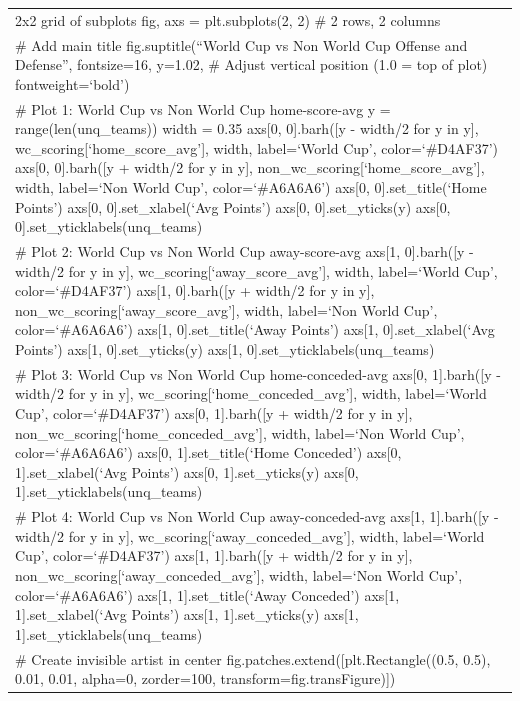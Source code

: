 \documentclass[
  letterpaper,
  DIV=11,
  numbers=noendperiod]{scrartcl}
\begin{document}
\begin{longtable}[]{@{}
  >{\raggedright\arraybackslash}p{}@{}}
2x2 grid of subplots fig, axs = plt.subplots(2, 2) \# 2 rows, 2
columns \\
\# Add main title fig.suptitle(``World Cup vs Non World Cup Offense and
Defense'', fontsize=16, y=1.02, \# Adjust vertical position (1.0 = top
of plot) fontweight=`bold') \\
\# Plot 1: World Cup vs Non World Cup home-score-avg y =
range(len(unq\_teams)) width = 0.35 axs{[}0, 0{]}.barh({[}y - width/2
for y in y{]}, wc\_scoring{[}`home\_score\_avg'{]}, width, label=`World
Cup', color=`\#D4AF37') axs{[}0, 0{]}.barh({[}y + width/2 for y in y{]},
non\_wc\_scoring{[}`home\_score\_avg'{]}, width, label=`Non World Cup',
color=`\#A6A6A6') axs{[}0, 0{]}.set\_title(`Home Points') axs{[}0,
0{]}.set\_xlabel(`Avg Points') axs{[}0, 0{]}.set\_yticks(y) axs{[}0,
0{]}.set\_yticklabels(unq\_teams) \\
\# Plot 2: World Cup vs Non World Cup away-score-avg axs{[}1,
0{]}.barh({[}y - width/2 for y in y{]},
wc\_scoring{[}`away\_score\_avg'{]}, width, label=`World Cup',
color=`\#D4AF37') axs{[}1, 0{]}.barh({[}y + width/2 for y in y{]},
non\_wc\_scoring{[}`away\_score\_avg'{]}, width, label=`Non World Cup',
color=`\#A6A6A6') axs{[}1, 0{]}.set\_title(`Away Points') axs{[}1,
0{]}.set\_xlabel(`Avg Points') axs{[}1, 0{]}.set\_yticks(y) axs{[}1,
0{]}.set\_yticklabels(unq\_teams) \\
\# Plot 3: World Cup vs Non World Cup home-conceded-avg axs{[}0,
1{]}.barh({[}y - width/2 for y in y{]},
wc\_scoring{[}`home\_conceded\_avg'{]}, width, label=`World Cup',
color=`\#D4AF37') axs{[}0, 1{]}.barh({[}y + width/2 for y in y{]},
non\_wc\_scoring{[}`home\_conceded\_avg'{]}, width, label=`Non World
Cup', color=`\#A6A6A6') axs{[}0, 1{]}.set\_title(`Home Conceded')
axs{[}0, 1{]}.set\_xlabel(`Avg Points') axs{[}0, 1{]}.set\_yticks(y)
axs{[}0, 1{]}.set\_yticklabels(unq\_teams) \\
\# Plot 4: World Cup vs Non World Cup away-conceded-avg axs{[}1,
1{]}.barh({[}y - width/2 for y in y{]},
wc\_scoring{[}`away\_conceded\_avg'{]}, width, label=`World Cup',
color=`\#D4AF37') axs{[}1, 1{]}.barh({[}y + width/2 for y in y{]},
non\_wc\_scoring{[}`away\_conceded\_avg'{]}, width, label=`Non World
Cup', color=`\#A6A6A6') axs{[}1, 1{]}.set\_title(`Away Conceded')
axs{[}1, 1{]}.set\_xlabel(`Avg Points') axs{[}1, 1{]}.set\_yticks(y)
axs{[}1, 1{]}.set\_yticklabels(unq\_teams) \\
\# Create invisible artist in center
fig.patches.extend({[}plt.Rectangle((0.5, 0.5), 0.01, 0.01, alpha=0,
zorder=100, transform=fig.transFigure){]}) \\

\end{longtable}
\end{document}
